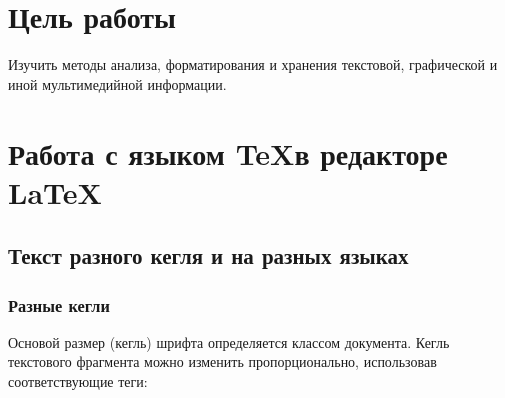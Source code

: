 \documentclass[a4paper]{article}
\begin{document}
\section{Цель работы}
Изучить методы анализа, форматирования и хранения текстовой, графической и иной мультимедийной информации.
\section{Работа с языком \TeX в редакторе \LaTeX}

\subsection{Текст разного кегля и на разных языках}
\subsubsection{Разные кегли}
Основой размер (кегль) шрифта определяется классом документа. 
Кегль текстового фрагмента можно изменить пропорционально, использовав соответствующие теги:
\end{document}
